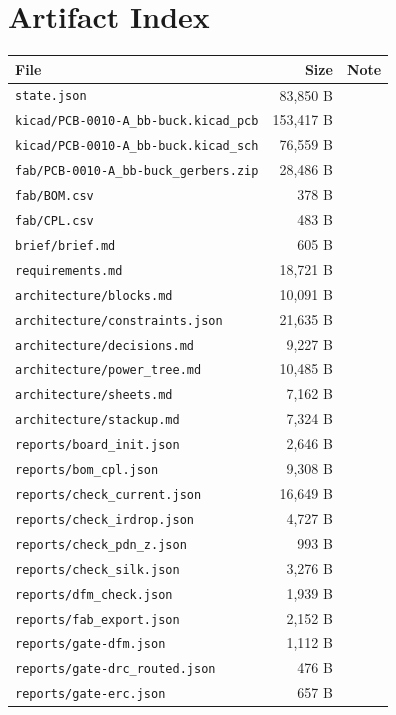 \documentclass[11pt,a4paper]{article}
\begin{document}
\section{Artifact Index}
{\small
\begin{longtable}{p{9cm}rp{4cm}}
\toprule
\textbf{File} & \textbf{Size} & \textbf{Note} \\
\midrule
\endhead
\texttt{state.json} & 83,850 B &  \\
\texttt{kicad/PCB-0010-A\_bb-buck.kicad\_pcb} & 153,417 B &  \\
\texttt{kicad/PCB-0010-A\_bb-buck.kicad\_sch} & 76,559 B &  \\
\texttt{fab/PCB-0010-A\_bb-buck\_gerbers.zip} & 28,486 B &  \\
\texttt{fab/BOM.csv} & 378 B &  \\
\texttt{fab/CPL.csv} & 483 B &  \\
\texttt{brief/brief.md} & 605 B &  \\
\texttt{requirements.md} & 18,721 B &  \\
\texttt{architecture/blocks.md} & 10,091 B &  \\
\texttt{architecture/constraints.json} & 21,635 B &  \\
\texttt{architecture/decisions.md} & 9,227 B &  \\
\texttt{architecture/power\_tree.md} & 10,485 B &  \\
\texttt{architecture/sheets.md} & 7,162 B &  \\
\texttt{architecture/stackup.md} & 7,324 B &  \\
\texttt{reports/board\_init.json} & 2,646 B &  \\
\texttt{reports/bom\_cpl.json} & 9,308 B &  \\
\texttt{reports/check\_current.json} & 16,649 B &  \\
\texttt{reports/check\_irdrop.json} & 4,727 B &  \\
\texttt{reports/check\_pdn\_z.json} & 993 B &  \\
\texttt{reports/check\_silk.json} & 3,276 B &  \\
\texttt{reports/dfm\_check.json} & 1,939 B &  \\
\texttt{reports/fab\_export.json} & 2,152 B &  \\
\texttt{reports/gate-dfm.json} & 1,112 B &  \\
\texttt{reports/gate-drc\_routed.json} & 476 B &  \\
\texttt{reports/gate-erc.json} & 657 B &  \\

\end{longtable}}
\end{document}
